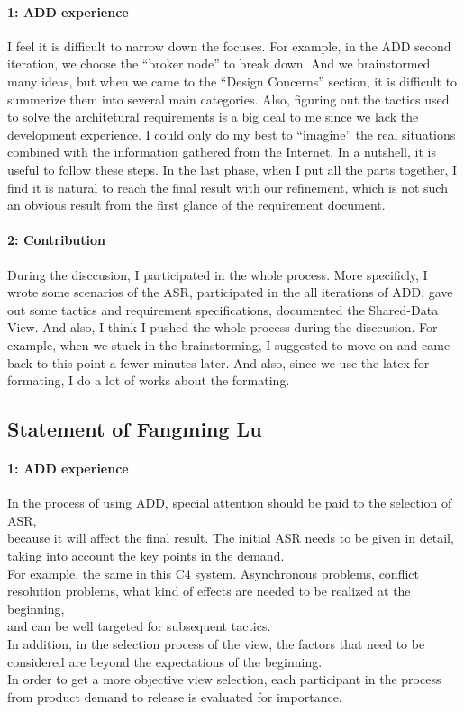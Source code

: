 \documentclass{article}
\begin{document}
	\paragraph{1: ADD experience}
	I feel it is difficult to narrow down the focuses. For example, in the ADD second iteration, we choose the “broker node” to break down. And we brainstormed many ideas, but when we came to the “Design Concerns” section, it is difficult to summerize them into several main categories.
Also, figuring out the tactics used to solve the architetural requirements is a big deal to me since we lack the development experience. I could only do my best to “imagine” the real situations combined with the information gathered from the Internet.
In a nutshell, it is useful to follow these steps. In the last phase, when I put all the parts together, I find it is natural to reach the final result with our refinement, which is not such an obvious result from the first glance of the requirement document.
	\paragraph{2: Contribution}
	During the disccusion, I participated in the whole process.
	More specificly, I wrote some scenarios of the ASR, participated in the all iterations of ADD, gave out some tactics and requirement specifications, documented the Shared-Data View.
	And also, I think I pushed the whole process during the disccusion. For example, when we stuck in the brainstorming, I suggested to move on and came back to this point a fewer minutes later. 
	And also, since we use the latex for formating, I do a lot of works about the formating.

	\subsection{Statement of Fangming Lu}
	\paragraph{1: ADD experience}
		In the process of using ADD, special attention should be paid to the selection of ASR, \\
	because it will affect the final result. The initial ASR needs to be given in detail, taking into account the key points in the demand. \\
	For example, the same in this C4 system. Asynchronous problems, conflict resolution problems, what kind of effects are needed to be realized at the beginning, \\
	and can be well targeted for subsequent tactics.\\
	In addition, in the selection process of the view, the factors that need to be considered are beyond the expectations of the beginning. \\
	In order to get a more objective view selection, each participant in the process from product demand to release is evaluated for importance.\\
\end{document}
